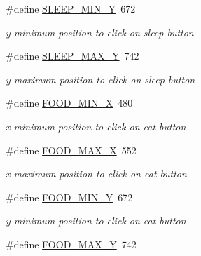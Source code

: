 \begin{DoxyCompactItemize}
\#define \hyperlink{group___project_gaf327dc5b36b345fbdefccdd9211f3d3f}{S\+L\+E\+E\+P\+\_\+\+M\+I\+N\+\_\+Y}~672
\begin{DoxyCompactList}\small\item\em y minimum position to click on sleep button \end{DoxyCompactList}\item 
\mbox{\label{group___project_gafde80522a65826a3d7678ed9ad947167}} 
\#define \hyperlink{group___project_gafde80522a65826a3d7678ed9ad947167}{S\+L\+E\+E\+P\+\_\+\+M\+A\+X\+\_\+Y}~742
\begin{DoxyCompactList}\small\item\em y maximum position to click on sleep button \end{DoxyCompactList}\item 
\mbox{\label{group___project_gaeced07734c58c78406f76a53b1a6e648}} 
\#define \hyperlink{group___project_gaeced07734c58c78406f76a53b1a6e648}{F\+O\+O\+D\+\_\+\+M\+I\+N\+\_\+X}~480
\begin{DoxyCompactList}\small\item\em x minimum position to click on eat button \end{DoxyCompactList}\item 
\mbox{\label{group___project_ga9bb9fa7b7fe230cd8be9a26797902210}} 
\#define \hyperlink{group___project_ga9bb9fa7b7fe230cd8be9a26797902210}{F\+O\+O\+D\+\_\+\+M\+A\+X\+\_\+X}~552
\begin{DoxyCompactList}\small\item\em x maximum position to click on eat button \end{DoxyCompactList}\item 
\mbox{\label{group___project_ga4c30b79a83f9cce7eb04ed9c67d4a687}} 
\#define \hyperlink{group___project_ga4c30b79a83f9cce7eb04ed9c67d4a687}{F\+O\+O\+D\+\_\+\+M\+I\+N\+\_\+Y}~672
\begin{DoxyCompactList}\small\item\em y minimum position to click on eat button \end{DoxyCompactList}\item 
\mbox{\label{group___project_ga3765abdc6f8b6f8be252448a3617c56d}} 
\#define \hyperlink{group___project_ga3765abdc6f8b6f8be252448a3617c56d}{F\+O\+O\+D\+\_\+\+M\+A\+X\+\_\+Y}~742

\end{DoxyCompactItemize}
